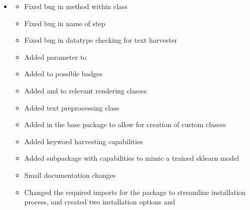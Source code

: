 \documentclass[letterpaper,10pt,english]{sphinxmanual}
\begin{document}
\begin{itemize}
\begin{description}
\begin{itemize}
\end{itemize}

\end{description}

\item {} \begin{description}
\begin{itemize}
\item {} 
\sphinxAtStartPar
Fixed bug in  method within  class

\item {} 
\sphinxAtStartPar
Fixed bug in name of  step

\item {} 
\sphinxAtStartPar
Fixed bug in datatype checking for text harvester

\item {} 
\sphinxAtStartPar
Added  parameter to 

\item {} 
\sphinxAtStartPar
Added  to possible badges

\item {} 
\sphinxAtStartPar
Added  and  to relevant rendering classes

\item {} 
\sphinxAtStartPar
Added  text preprocessing class

\item {} 
\sphinxAtStartPar
Added  in the base package to allow for creation of custom classes

\item {} 
\sphinxAtStartPar
Added keyword harvesting capabilities

\item {} 
\sphinxAtStartPar
Added  subpackage with capabilities to mimic a trained sklearn model

\item {} 
\sphinxAtStartPar
Small documentation changes

\item {} 
\sphinxAtStartPar
Changed the required imports for the package to streamline installation process, and created two installation options  and 


\end{itemize}
\end{description}
\end{itemize}
\end{document}
